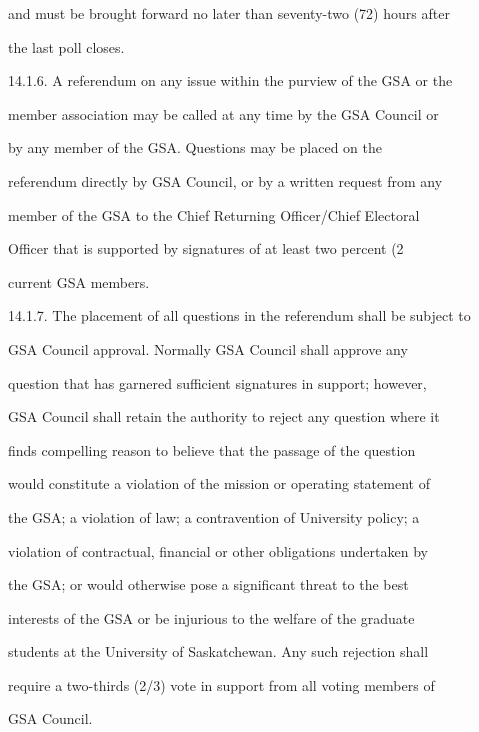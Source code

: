         and must be brought forward no later than seventy-two (72) hours after  

        the last poll closes.  



14.1.6.     A referendum on any issue within the purview of the GSA or the  

        member association may be called at any time by the GSA  Council or  

        by   any   member   of   the   GSA.   Questions   may   be   placed   on   the  

        referendum directly by GSA Council, or by a written request from any  

        member  of  the  GSA  to  the  Chief  Returning  Officer/Chief  Electoral  

        Officer that is supported by signatures of at least two percent (2%

        current GSA members.  



14.1.7.     The placement of all questions in the referendum shall be subject to  

        GSA  Council  approval.  Normally  GSA  Council  shall  approve  any  

        question  that  has  garnered  sufficient  signatures  in  support;  however,  

        GSA  Council shall retain the authority to reject any question where it  

        finds  compelling  reason  to  believe  that  the  passage  of  the  question  

        would constitute a violation of the mission or operating statement of  

        the  GSA;  a  violation  of  law;  a  contravention  of  University  policy;  a  

        violation  of  contractual,  financial  or  other  obligations  undertaken  by  

        the  GSA;  or  would  otherwise  pose  a  significant  threat  to  the  best  

        interests  of  the  GSA  or  be  injurious  to  the  welfare  of  the  graduate  

        students  at the  University of  Saskatchewan. Any  such  rejection shall  

        require a two-thirds (2/3) vote in support from all voting members of  

        GSA Council.  




